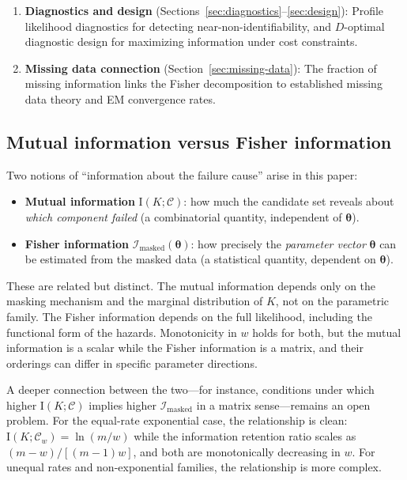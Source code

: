 \documentclass[11pt]{article}
\theoremstyle{definition}
\theoremstyle{plain}
\renewcommand{\v}[1]{\boldsymbol{#1}}
\newcommand{\btheta}{\v{\theta}}
\newcommand{\FI}{\mathcal{I}}       %
\newcommand{\MI}{\mathrm{I}}        %
\begin{document}
\begin{enumerate}
    \item \textbf{Diagnostics and design}
    (Sections~\ref{sec:diagnostics}--\ref{sec:design}): Profile
    likelihood diagnostics for detecting near-non-identifiability,
    and $D$-optimal diagnostic design for maximizing information
    under cost constraints.

    \item \textbf{Missing data connection}
    (Section~\ref{sec:missing-data}): The fraction of missing
    information links the Fisher decomposition to established
    missing data theory and EM convergence rates.
\end{enumerate}

\subsection{Mutual information versus Fisher information}

Two notions of ``information about the failure cause'' arise in
this paper:
\begin{itemize}[nosep]
    \item \textbf{Mutual information} $\MI(K; \mathcal{C})$:
    how much the candidate set reveals about \emph{which component
    failed} (a combinatorial quantity, independent of $\btheta$).
    \item \textbf{Fisher information} $\FI_{\mathrm{masked}}(\btheta)$:
    how precisely the \emph{parameter vector} $\btheta$ can be
    estimated from the masked data (a statistical quantity, dependent
    on $\btheta$).
\end{itemize}

These are related but distinct.
The mutual information depends only on the masking mechanism and the
marginal distribution of $K$, not on the parametric family.
The Fisher information depends on the full likelihood, including the
functional form of the hazards.
Monotonicity in $w$ holds for both, but the mutual information is
a scalar while the Fisher information is a matrix, and their orderings
can differ in specific parameter directions.

A deeper connection between the two---for instance, conditions under
which higher $\MI(K; \mathcal{C})$ implies higher
$\FI_{\mathrm{masked}}$ in a matrix sense---remains an open problem.
For the equal-rate exponential case, the relationship is clean:
$\MI(K; \mathcal{C}_w) = \ln(m/w)$ while the information retention
ratio scales as $(m-w)/[(m-1)w]$, and both are monotonically
decreasing in $w$.
For unequal rates and non-exponential families, the relationship
is more complex.
\end{document}
